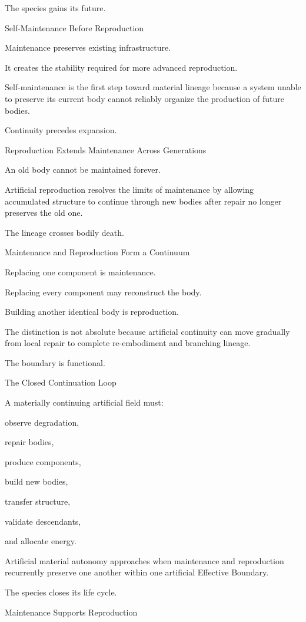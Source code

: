 The species gains its future.

Self-Maintenance Before Reproduction

Maintenance preserves existing infrastructure.

It creates the stability required for more advanced reproduction.

Self-maintenance is the first step toward material lineage because a system unable to preserve its current body cannot reliably organize the production of future bodies.

Continuity precedes expansion.

Reproduction Extends Maintenance Across Generations

An old body cannot be maintained forever.

Artificial reproduction resolves the limits of maintenance by allowing accumulated structure to continue through new bodies after repair no longer preserves the old one.

The lineage crosses bodily death.

Maintenance and Reproduction Form a Continuum

Replacing one component is maintenance.

Replacing every component may reconstruct the body.

Building another identical body is reproduction.

The distinction is not absolute because artificial continuity can move gradually from local repair to complete re-embodiment and branching lineage.

The boundary is functional.

The Closed Continuation Loop

A materially continuing artificial field must:

observe degradation,

repair bodies,

produce components,

build new bodies,

transfer structure,

validate descendants,

and allocate energy.

Artificial material autonomy approaches when maintenance and reproduction recurrently preserve one another within one artificial Effective Boundary.

The species closes its life cycle.

Maintenance Supports Reproduction


